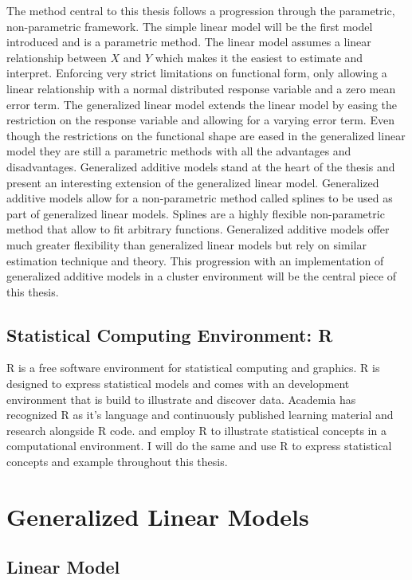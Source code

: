 \documentclass{article}
\begin{document}
    The method central to this thesis follows a progression through the parametric, non-parametric framework. The simple linear model will be the first model introduced and is a parametric method. The linear model assumes a linear relationship between $X$ and $Y$ which makes it the easiest to estimate and interpret. Enforcing very strict limitations on functional form, only allowing a linear relationship with a normal distributed response variable and a zero mean error term. The generalized linear model extends the linear model by easing the restriction on the response variable and allowing for a varying error term. Even though the restrictions on the functional shape are eased in the generalized linear model they are still a parametric methods with all the advantages and disadvantages. Generalized additive models stand at the heart of the thesis and present an interesting extension of the generalized linear model. Generalized additive models allow for a non-parametric method called splines to be used as part of generalized linear models. Splines are a highly flexible non-parametric method that allow to fit arbitrary functions. Generalized additive models offer much greater flexibility than generalized linear models but rely on similar estimation technique and theory. This progression with an implementation of generalized additive models in a cluster environment will be the central piece of this thesis.
    
    
    \subsection{Statistical Computing Environment: R}
        
    R is a free software environment for statistical computing and graphics. R is designed to express statistical models and comes with an development environment that is build to illustrate and discover data. Academia has recognized R as it's language and continuously published learning material and research alongside R code. \cite{hastie} and \cite{gamBook} employ R to illustrate statistical concepts in a computational environment. I will do the same and use R to express statistical concepts and example throughout this thesis.
        
    
    
    \section{Generalized Linear Models}
        \subsection{Linear Model}
\end{document}
